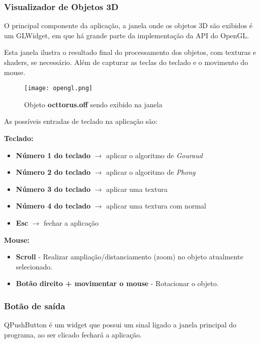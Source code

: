 \newpage

\subsubsection{Visualizador de Objetos 3D}

O principal componente da aplicação, a janela onde os objetos 3D 
são exibidos é um GLWidget, em que há grande parte da implementação da 
API do OpenGL.

Esta janela ilustra o resultado final do processamento dos objetos, com texturas e shaders, se necessário.
Além de capturar as teclas do teclado e o movimento do mouse.


\begin{figure}[H]
    \centering
    \texttt{[image: opengl.png]}
    \caption{Objeto \textbf{octtorus.off} sendo exibido na janela}
\end{figure}

As possíveis entradas de teclado na aplicação são:

\textbf{Teclado:}

\begin{itemize}
    \item \textbf{Número 1 do teclado} $\rightarrow$ aplicar o algoritmo de \emph{Gouraud}
    \item \textbf{Número 2 do teclado} $\rightarrow$ aplicar o algoritmo de \emph{Phong}
    \item \textbf{Número 3 do teclado} $\rightarrow$ aplicar uma textura
    \item \textbf{Número 4 do teclado} $\rightarrow$ aplicar uma textura com normal
    \item \textbf{Esc} $\rightarrow$ fechar a aplicação
\end{itemize}

\textbf{Mouse:}

\begin{itemize}
    \item \textbf{Scroll} - Realizar ampliação/distanciamento (zoom) no objeto 
    atualmente selecionado. 
    \item \textbf{Botão direito + movimentar o mouse} - Rotacionar o objeto.
\end{itemize}

\subsubsection{Botão de saída}

QPushButton é um widget que possui um sinal ligado a janela principal do programa,
ao ser clicado fechará a aplicação.

